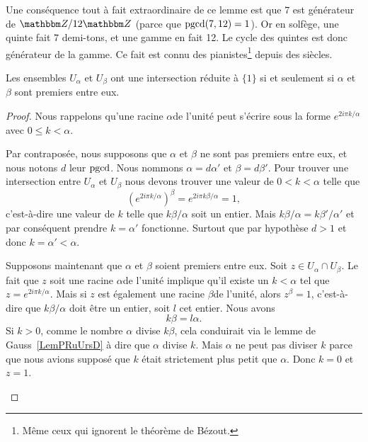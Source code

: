 \begin{example}
Une conséquence tout à fait extraordinaire de ce lemme est que \( 7\) est générateur de \( \eZ/12\eZ\) (parce que \( \operatorname{pgcd}(7,12)=1\)). Or en solfège, une quinte fait \( 7\) demi-tons, et une gamme en fait 12. Le cycle des quintes est donc générateur de la gamme\cite{YDXsAM}. Ce fait est connu des pianistes\footnote{Même ceux qui ignorent le théorème de Bézout.} depuis des siècles.
\end{example}

\begin{proposition}      \label{PROPooIOQEooGMcCJm}
    Les ensembles \( U_{\alpha}\) et \( U_{\beta}\) ont une intersection réduite à \( \{ 1 \}\) si et seulement si \( \alpha\) et \( \beta\) sont premiers entre eux.
\end{proposition}

\begin{proof}
    Nous rappelons qu'une racine \( \alpha\)\ieme de l'unité peut s'écrire sous la forme \(  e^{2i\pi k/\alpha}\) avec \( 0\leq k<\alpha\).
    \begin{subproof}
    \item[Sens direct]
        Par contraposée, nous supposons que \( \alpha\) et \( \beta\) ne sont pas premiers entre eux, et nous notons \( d\) leur \( \operatorname{pgcd}\). Nous nommons \( \alpha=d\alpha'\) et \( \beta=d\beta'\). Pour trouver une intersection entre \( U_{\alpha}\) et \( U_{\beta}\) nous devons trouver une valeur de \( 0<k<\alpha\) telle que
        \begin{equation}
            ( e^{2i\pi k/\alpha})^{\beta}= e^{2i\pi k\beta/\alpha}=1,
        \end{equation}
        c'est-à-dire une valeur de \( k\) telle que \( k\beta/\alpha\) soit un entier. Mais \( k\beta/\alpha=k\beta'/\alpha'\) et par conséquent prendre \( k=\alpha'\) fonctionne. Surtout que par hypothèse \( d>1\) et donc \( k=\alpha'<\alpha\).
    \item[Sens réciproque]
        Supposons maintenant que \( \alpha\) et \( \beta \) soient premiers entre eux. Soit \( z\in U_{\alpha}\cap U_{\beta}\). Le fait que \( z\) soit une racine \( \alpha\)\ieme de l'unité implique qu'il existe un \( k<\alpha\) tel que \( z= e^{2i\pi k/\alpha}\). Mais si \( z\) est également une racine \( \beta\)\ieme de l'unité, alors \( z^{\beta}=1\), c'est-à-dire que \( k\beta/\alpha\) doit être un entier, soit \( l\) cet entier. Nous avons
        \begin{equation}
            k\beta=l\alpha.
        \end{equation}
		Si \( k>0\), comme le nombre \( \alpha\) divise \( k\beta\), cela conduirait via le lemme de Gauss~\ref{LemPRuUrsD} à dire que \( \alpha\) divise \( k\). Mais \( \alpha\) ne peut pas diviser \( k\) parce que nous avions supposé que \( k\) était strictement plus petit que \( \alpha\). Donc \( k = 0\) et \( z = 1\).
    \end{subproof}
\end{proof}

